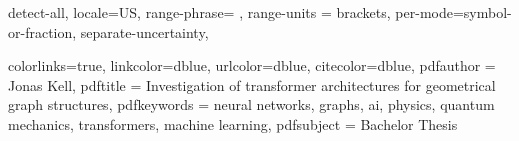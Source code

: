 \graphicspath{{./images/}}              %

\sisetup                                %
{
detect-all,
locale=US,                              %
range-phrase={  },             %
range-units = brackets,                 %
per-mode=symbol-or-fraction,            %
separate-uncertainty,                   %
}

\hypersetup
{
colorlinks=true,
linkcolor=dblue,                                    %
urlcolor=dblue,                                     %
citecolor=dblue,                                    %
pdfauthor = {Jonas Kell},                           %
pdftitle = {Investigation of transformer architectures for geometrical graph structures},                         
pdfkeywords = {neural networks, graphs, ai, physics, quantum mechanics, transformers, machine learning},           
pdfsubject = {Bachelor Thesis}                      
}




